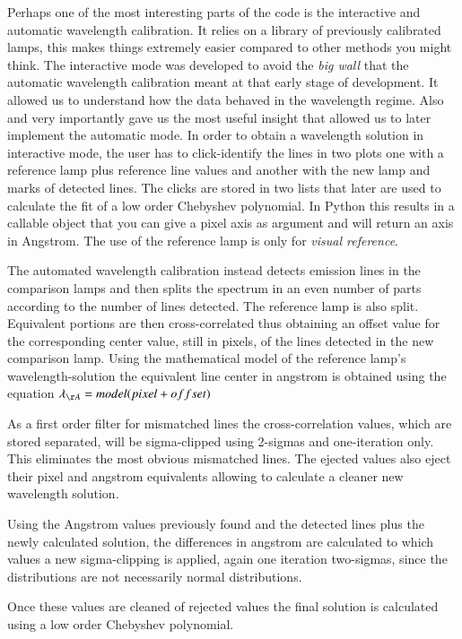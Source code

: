 \documentclass[11pt,twoside]{article}
\begin{document}
Perhaps one of the most interesting parts of the code is the interactive and
automatic wavelength calibration. It relies on a library of previously calibrated
lamps, this makes things extremely easier compared to other methods you might think.
The interactive mode was developed to avoid the \emph{big wall} that the automatic
wavelength calibration meant at that early stage of development. It allowed us to 
understand how the data behaved in the wavelength regime. Also and very importantly
gave us the most useful insight that allowed us to later implement the automatic mode.
In order to obtain a wavelength solution in interactive mode, the user has to click-identify 
the lines in two plots one with a reference lamp plus reference line values and
another with the new lamp and marks of detected lines. The clicks are stored in
two lists that later are used to calculate the fit of a low order Chebyshev polynomial.
In Python this results in a callable object that you can give a pixel axis as argument 
and will return an axis in Angstrom. The use of the reference lamp is only for
\emph{visual reference}.

The automated wavelength calibration instead detects emission lines in the comparison lamps
and then splits the spectrum in an even number of parts according to the number of lines detected.
The reference lamp is also split. Equivalent portions are then cross-correlated 
thus obtaining an offset value for the corresponding center value, still in pixels, 
of the lines detected in the new comparison lamp. Using the mathematical model of the reference
lamp's wavelength-solution  the equivalent line center in angstrom is obtained 
using the equation $ \lambda_{\AA} = model(pixel + offset)$


As a first order filter for mismatched lines the cross-correlation values, which
are stored separated, will be sigma-clipped using 2-sigmas and one-iteration only.
This eliminates the most obvious mismatched lines. The ejected values also eject
their pixel and angstrom equivalents allowing to calculate a cleaner new wavelength solution.


Using the Angstrom values previously found and the detected lines
plus the newly calculated solution, the differences in angstrom are
calculated to which values a new sigma-clipping is applied, again
one iteration two-sigmas, since the distributions are not
necessarily normal distributions.

Once these values are cleaned of rejected values the final solution
is calculated using a low order Chebyshev polynomial.
\end{document}
